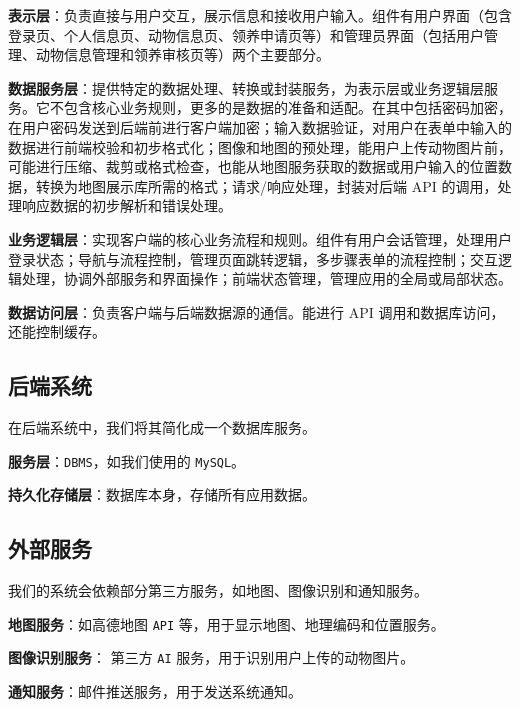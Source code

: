 \documentclass[12pt,a4paper,UTF8]{article}
\begin{document}
\vspace{0.25cm}

\textbf{表示层}：负责直接与用户交互，展示信息和接收用户输入。组件有用户界面（包含登录页、个人信息页、动物信息页、领养申请页等）和管理员界面（包括用户管理、动物信息管理和领养审核页等）两个主要部分。

\textbf{数据服务层}：提供特定的数据处理、转换或封装服务，为表示层或业务逻辑层服务。它不包含核心业务规则，更多的是数据的准备和适配。在其中包括密码加密，在用户密码发送到后端前进行客户端加密；输入数据验证，对用户在表单中输入的数据进行前端校验和初步格式化；图像和地图的预处理，能用户上传动物图片前，可能进行压缩、裁剪或格式检查，也能从地图服务获取的数据或用户输入的位置数据，转换为地图展示库所需的格式；请求/响应处理，封装对后端 API 的调用，处理响应数据的初步解析和错误处理。

\textbf{业务逻辑层}：实现客户端的核心业务流程和规则。组件有用户会话管理，处理用户登录状态；导航与流程控制，管理页面跳转逻辑，多步骤表单的流程控制；交互逻辑处理，协调外部服务和界面操作；前端状态管理，管理应用的全局或局部状态。

\textbf{数据访问层}：负责客户端与后端数据源的通信。能进行 API 调用和数据库访问，还能控制缓存。

\subsection{后端系统}

在后端系统中，我们将其简化成一个数据库服务。

\vspace{0.25cm}

\textbf{服务层}：\verb|DBMS|，如我们使用的 \verb|MySQL|。

\textbf{持久化存储层}：数据库本身，存储所有应用数据。

\subsection{外部服务}

我们的系统会依赖部分第三方服务，如地图、图像识别和通知服务。

\vspace{0.25cm}

\textbf{地图服务}：如高德地图 \verb|API| 等，用于显示地图、地理编码和位置服务。

\textbf{图像识别服务}： 第三方 \verb|AI| 服务，用于识别用户上传的动物图片。

\textbf{通知服务}：邮件推送服务，用于发送系统通知。
\end{document}
